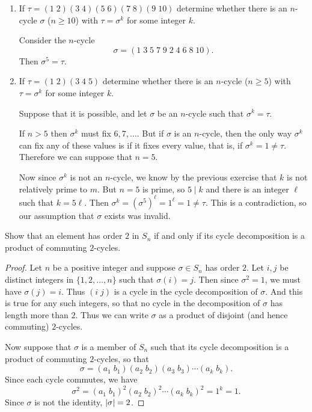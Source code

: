 \begin{enumerate}
\item If $\tau = (1\;2)(3\;4)(5\;6)(7\;8)(9\;10)$ determine whether
  there is an $n$-cycle $\sigma$ ($n\geq10$) with $\tau = \sigma^k$
  for some integer $k$.
  \begin{solution}
    Consider the $n$-cycle
    \begin{equation*}
      \sigma = (1\;3\;5\;7\;9\;2\;4\;6\;8\;10).
    \end{equation*}
    Then $\sigma^5 = \tau$.
  \end{solution}
\item If $\tau = (1\;2)(3\;4\;5)$ determine whether there is an
  $n$-cycle ($n\geq5$) with $\tau = \sigma^k$ for some integer $k$.
  \begin{solution}
    Suppose that it is possible, and let $\sigma$ be an $n$-cycle such
    that $\sigma^k = \tau$.

    If $n>5$ then $\sigma^k$ must fix $6, 7, \dots$. But if $\sigma$
    is an $n$-cycle, then the only way $\sigma^k$ can fix any of these
    values is if it fixes every value, that is, if
    $\sigma^k = 1 \neq \tau$. Therefore we can suppose that $n = 5$.

    Now since $\sigma^k$ is not an $n$-cycle, we know by the previous
    exercise that $k$ is not relatively prime to $m$. But $n = 5$ is
    prime, so $5\mid k$ and there is an integer $\ell$ such that
    $k = 5\ell$. Then
    $\sigma^k = (\sigma^5)^\ell = 1^\ell = 1\neq\tau$. This is a
    contradiction, so our assumption that $\sigma$ exists was invalid.
  \end{solution}
\end{enumerate}

 Show that an element has order $2$ in $S_n$ if and only
if its cycle decomposition is a product of commuting $2$-cycles.
\begin{proof}
  Let $n$ be a positive integer and suppose $\sigma\in S_n$ has order
  $2$. Let $i,j$ be distinct integers in $\{1, 2, \dots, n\}$ such
  that $\sigma(i) = j$. Then since $\sigma^2 = 1$, we must have
  $\sigma(j) = i$. Thus $(i\;j)$ is a cycle in the cycle decomposition
  of $\sigma$. And this is true for any such integers, so that no
  cycle in the decomposition of $\sigma$ has length more than
  $2$. Thus we can write $\sigma$ as a product of disjoint (and hence
  commuting) $2$-cycles.

  Now suppose that $\sigma$ is a member of $S_n$ such that its cycle
  decomposition is a product of commuting $2$-cycles, so that
  \begin{equation*}
    \sigma = (a_1\;b_1)(a_2\;b_2)(a_3\;b_3)\cdots(a_k\;b_k).
  \end{equation*}
  Since each cycle commutes, we have
  \begin{equation*}
    \sigma^2 = (a_1\;b_1)^2(a_2\;b_2)^2\cdots(a_k\;b_k)^2 = 1^k = 1.
  \end{equation*}
  Since $\sigma$ is not the identity, $\lvert{\sigma}\rvert = 2$.
\end{proof}
